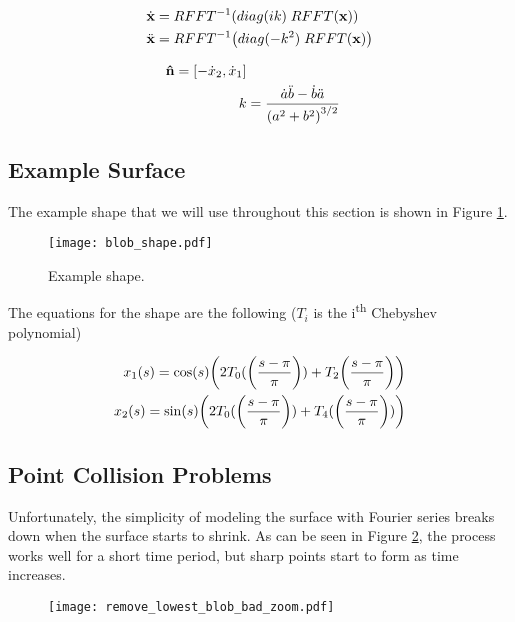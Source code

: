 \begin{align}
  \dot{\bvec{x}}& = RFFT^{-1}\paren{diag(ik) \; RFFT(\bvec{x})}\\
  \ddot{\bvec{x}}& = RFFT^{-1}\paren{diag(-k^2) \; RFFT(\bvec{x})}\\
\end{align}

\begin{align}
  \bhat{n} = [-\dot{x}_2, \dot{x}_1]\\
  k& = \frac{\dot{a} \ddot{b} - \dot{b} \ddot{a}}{\paren{a^2 + b^2}^{3/2}}
\end{align}

\subsection*{Example Surface}

The example shape that we will use throughout this section is shown in Figure \ref{fig:blob-shape}.

\begin{figure}[H]
    \begin{center}
      \texttt{[image: blob\_shape.pdf]}
    \end{center}
  \vspace{-.2in} %
  \caption{\label{fig:blob-shape} Example shape.}
\end{figure}

The equations for the shape are the following ($T_i$ is the i\textsuperscript{th} Chebyshev polynomial)

\begin{align*}
  x_1(s) = \cos(s) \paren{2 T_0(\paren{\frac{s-\pi}{\pi}}) + T_2\paren{\frac{s-\pi}{\pi}}}\\
  x_2(s) = \sin(s) \paren{2 T_0(\paren{\frac{s-\pi}{\pi}}) + T_4(\paren{\frac{s-\pi}{\pi}})}
\end{align*}

\subsection*{Point Collision Problems}

Unfortunately, the simplicity of modeling the surface with Fourier series breaks down when the surface starts to shrink. As can be seen in Figure \ref{fig:remove-lowest-blob-bad}, the process works well for a short time period, but sharp points start to form as time increases.


\begin{figure}[H]
    \begin{center}
      \texttt{[image: remove\_lowest\_blob\_bad\_zoom.pdf]}
    \end{center}
  \vspace{-.2in} %
  \caption{\label{fig:remove-lowest-blob-bad}}
\end{figure}

